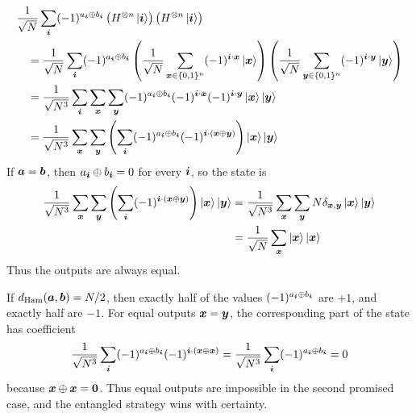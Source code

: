 \[
\begin{aligned}
&\frac{1}{\sqrt N}
\sum_{{\boldsymbol{i}}}
(-1)^{a_{{\boldsymbol{i}}}\oplus b_{{\boldsymbol{i}}}}
\left(
H^{\otimes n}\ket{{\boldsymbol{i}}}
\right)
\left(
H^{\otimes n}\ket{{\boldsymbol{i}}}
\right)
\\
&\quad=
\frac{1}{\sqrt N}
\sum_{{\boldsymbol{i}}}
(-1)^{a_{{\boldsymbol{i}}}\oplus b_{{\boldsymbol{i}}}}
\left(
\frac{1}{\sqrt N}
\sum_{{\boldsymbol{x}}\in\{0,1\}^n}
(-1)^{{\boldsymbol{i}}\cdot{\boldsymbol{x}}}
\ket{{\boldsymbol{x}}}
\right)
\left(
\frac{1}{\sqrt N}
\sum_{{\boldsymbol{y}}\in\{0,1\}^n}
(-1)^{{\boldsymbol{i}}\cdot{\boldsymbol{y}}}
\ket{{\boldsymbol{y}}}
\right)
\\
&\quad=
\frac{1}{\sqrt{N^3}}
\sum_{{\boldsymbol{i}}}
\sum_{{\boldsymbol{x}}}
\sum_{{\boldsymbol{y}}}
(-1)^{a_{{\boldsymbol{i}}}\oplus b_{{\boldsymbol{i}}}}
(-1)^{{\boldsymbol{i}}\cdot{\boldsymbol{x}}}
(-1)^{{\boldsymbol{i}}\cdot{\boldsymbol{y}}}
\ket{{\boldsymbol{x}}}\ket{{\boldsymbol{y}}}
\\
&\quad=
\frac{1}{\sqrt{N^3}}
\sum_{{\boldsymbol{x}}}
\sum_{{\boldsymbol{y}}}
\left(
\sum_{{\boldsymbol{i}}}
(-1)^{a_{{\boldsymbol{i}}}\oplus b_{{\boldsymbol{i}}}}
(-1)^{{\boldsymbol{i}}\cdot({\boldsymbol{x}}\oplus{\boldsymbol{y}})}
\right)
\ket{{\boldsymbol{x}}}\ket{{\boldsymbol{y}}}
\end{aligned}
\]
If \({\boldsymbol{a}}={\boldsymbol{b}}\), then \(a_{{\boldsymbol{i}}}\oplus b_{{\boldsymbol{i}}}=0\) for every \({\boldsymbol{i}}\), so the state is
\[
\begin{aligned}
\frac{1}{\sqrt{N^3}}
\sum_{{\boldsymbol{x}}}
\sum_{{\boldsymbol{y}}}
\left(
\sum_{{\boldsymbol{i}}}
(-1)^{{\boldsymbol{i}}\cdot({\boldsymbol{x}}\oplus{\boldsymbol{y}})}
\right)
\ket{{\boldsymbol{x}}}\ket{{\boldsymbol{y}}}
&=
\frac{1}{\sqrt{N^3}}
\sum_{{\boldsymbol{x}}}
\sum_{{\boldsymbol{y}}}
N \delta_{{\boldsymbol{x}},{\boldsymbol{y}}}
\ket{{\boldsymbol{x}}}\ket{{\boldsymbol{y}}}
\\
&=
\frac{1}{\sqrt N}
\sum_{{\boldsymbol{x}}}
\ket{{\boldsymbol{x}}}\ket{{\boldsymbol{x}}}
\end{aligned}
\]
Thus the outputs are always equal.

If \(d_{\text{Ham}}({\boldsymbol{a}},{\boldsymbol{b}})=N/2\), then exactly half of the values
\(
(-1)^{a_{{\boldsymbol{i}}}\oplus b_{{\boldsymbol{i}}}}
\)
are \(+1\), and exactly half are \(-1\).
For equal outputs \({\boldsymbol{x}}={\boldsymbol{y}}\), the corresponding part of the state has coefficient
\[
\frac{1}{\sqrt{N^3}}
\sum_{{\boldsymbol{i}}}
(-1)^{a_{{\boldsymbol{i}}}\oplus b_{{\boldsymbol{i}}}}
(-1)^{{\boldsymbol{i}}\cdot({\boldsymbol{x}}\oplus{\boldsymbol{x}})}
=
\frac{1}{\sqrt{N^3}}
\sum_{{\boldsymbol{i}}}
(-1)^{a_{{\boldsymbol{i}}}\oplus b_{{\boldsymbol{i}}}}
=
0
\]
because \({\boldsymbol{x}}\oplus{\boldsymbol{x}}={\boldsymbol{0}}\).
Thus equal outputs are impossible in the second promised case, and the entangled strategy wins with certainty.







